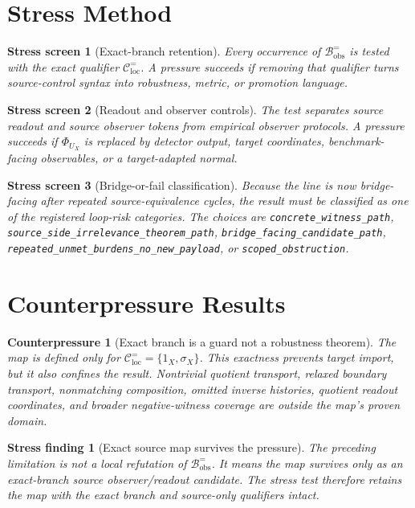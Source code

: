 \documentclass[11pt]{article}
\newcommand{\Bobs}{\mathcal{B}^{=}_{\mathrm{obs}}}
\newtheorem{stressscreen}{Stress screen}
\newtheorem{counterpressure}{Counterpressure}
\newtheorem{stressfinding}{Stress finding}
\begin{document}
\section{Stress Method}

\begin{stressscreen}[Exact-branch retention]
Every occurrence of \(\Bobs\) is tested with the exact qualifier
\(\mathcal{C}^{=}_{\mathrm{loc}}\). A pressure succeeds if removing
that qualifier turns source-control syntax into robustness, metric, or
promotion language.
\end{stressscreen}

\begin{stressscreen}[Readout and observer controls]
The test separates source readout and source observer tokens from
empirical observer protocols. A pressure succeeds if
\(\Phi_{U_X}\) is replaced by detector output, target coordinates,
benchmark-facing observables, or a target-adapted normal.
\end{stressscreen}

\begin{stressscreen}[Bridge-or-fail classification]
Because the line is now bridge-facing after repeated source-equivalence
cycles, the result must be classified as one of the registered
loop-risk categories. The choices are
\texttt{concrete\_witness\_path},
\texttt{source\_side\_irrelevance\_theorem\_path},
\texttt{bridge\_facing\_candidate\_path},
\texttt{repeated\_unmet\_burdens\_no\_new\_payload}, or
\texttt{scoped\_obstruction}.
\end{stressscreen}

\section{Counterpressure Results}

\begin{counterpressure}[Exact branch is a guard not a robustness theorem]
The map is defined only for
\(\mathcal{C}^{=}_{\mathrm{loc}}=\{1_X,\sigma_X\}\). This exactness
prevents target import, but it also confines the result. Nontrivial
quotient transport, relaxed boundary transport, nonmatching
composition, omitted inverse histories, quotient readout coordinates,
and broader negative-witness coverage are outside the map's proven
domain.
\end{counterpressure}

\begin{stressfinding}[Exact source map survives the pressure]
The preceding limitation is not a local refutation of \(\Bobs\). It
means the map survives only as an exact-branch source observer/readout
candidate. The stress test therefore retains the map with the exact
branch and source-only qualifiers intact.
\end{stressfinding}
\end{document}
